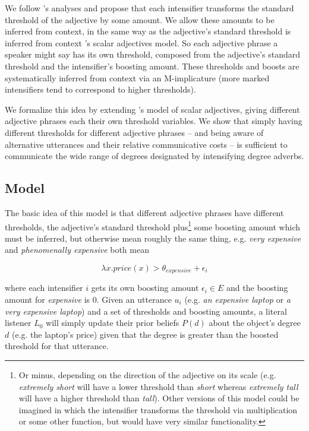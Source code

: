 \documentclass[10pt,letterpaper]{article}
\newcommand{\w}[1]{\emph{#1}}
\begin{document}
We follow 's analyses and propose that each intensifier transforms the standard threshold of the adjective by some amount. We allow these amounts to be inferred from context, in the same way as the adjective's standard threshold is inferred from context 's scalar adjectives model.
So each adjective phrase a speaker might say has its own threshold, composed from the adjective's standard threshold and the intensifier's boosting amount. These thresholds and boosts are systematically inferred from context via an M-implicature (more marked intensifiers tend to correspond to higher thresholds).

We formalize this idea by extending 's model of scalar adjectives, giving different adjective phrases each their own threshold variables. We show that simply having different thresholds for different adjective phrases -- and being aware of alternative utterances and their relative communicative costs -- is sufficient to communicate the wide range of degrees designated by intensifying degree adverbs.

\subsection{Model}


The basic idea of this model is that different adjective phrases have different thresholds, the adjective's standard threshold plus\footnote{Or minus, depending on the direction of the adjective on its scale (e.g. \w{extremely short} will have a lower threshold than \w{short} whereas \w{extremely tall} will have a higher threshold than \w{tall}). Other versions of this model could be imagined in which the intensifier transforms the threshold via multiplication or some other function, but would have very similar functionality.} some boosting amount which must be inferred, but otherwise mean roughly the same thing, e.g. \w{very expensive} and \w{phenomenally expensive} both mean

\[ \lambda x . price(x) > \theta_{expensive} + \epsilon_i \]

where each intensifier $i$ gets its own boosting amount $\epsilon_i \in E$ and the boosting amount for \w{expensive} is 0. 
Given an utterance $u_i$ (e.g. \w{an expensive laptop} or \w{a very expensive laptop}) and a set of thresholds and boosting amounts, a literal listener $L_0$ will simply update their prior beliefs $P(d)$ about the object's degree $d$ (e.g. the laptop's price) given that the degree is greater than the boosted threshold for that utterance.
\end{document}
